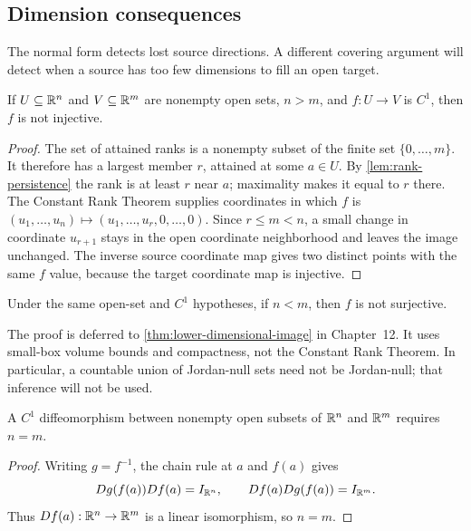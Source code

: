 \subsection{Dimension consequences}
The normal form detects lost source directions. A different covering
argument will detect when a source has too few dimensions to fill an open
target.
\begin{theorem}\label{thm:dimension-noninjective}
If $U\subseteq\mathbb{R}^n$ and $V\subseteq\mathbb{R}^m$ are nonempty open sets,
$n>m$, and $f:U\to V$ is $C^1$, then $f$ is not injective.
\end{theorem}
\begin{proof}
The set of attained ranks is a nonempty subset of the finite set
$\{0,\ldots,m\}$. It therefore has a largest member $r$, attained at
some $a\in U$. By \cref{lem:rank-persistence} the rank is at least $r$
near $a$; maximality makes it equal to $r$ there.
The Constant Rank Theorem supplies coordinates in which $f$ is
$(u_1,\ldots,u_n)\mapsto(u_1,\ldots,u_r,0,\ldots,0)$.
Since $r\leq m<n$, a small change in coordinate $u_{r+1}$ stays in
the open coordinate neighborhood and leaves the image unchanged. The
inverse source coordinate map gives two distinct points with the same
$f$ value, because the target coordinate map is injective.
\end{proof}
\begin{theorem}\label{thm:dimension-nonsurjective}
Under the same open-set and $C^1$ hypotheses, if $n<m$, then $f$ is
not surjective.
\end{theorem}
The proof is deferred to \cref{thm:lower-dimensional-image} in Chapter~12.
It uses small-box volume bounds and compactness, not the Constant Rank
Theorem. In particular, a countable union of Jordan-null sets need not
be Jordan-null; that inference will not be used.
\begin{proposition}\label{prop:diffeomorphism-dimension}
A $C^1$ diffeomorphism between nonempty open subsets of $\mathbb{R}^n$ and
$\mathbb{R}^m$ requires $n=m$.
\end{proposition}
\begin{proof}
Writing $g=f^{-1}$, the chain rule at $a$ and $f(a)$ gives
\[
Dg(f(a))Df(a)=I_{\mathbb{R}^n},\qquad Df(a)Dg(f(a))=I_{\mathbb{R}^m}.
\]
Thus $Df(a):\mathbb{R}^n\to\mathbb{R}^m$ is a linear isomorphism, so $n=m$.
\end{proof}

